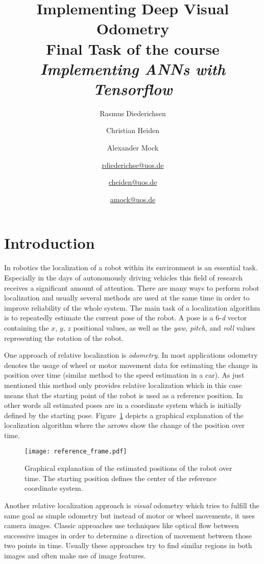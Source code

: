 \documentclass[a4paper,11pt]{article}
\title{Implementing Deep Visual Odometry\\{\large Final Task of the course \emph{Implementing ANNs with Tensorflow}}}
\author{Rasmus Diederichsen \and Christian Heiden \and Alexander Mock\\\and \href{mailto:rdiederichse@uos.de}{rdiederichse@uos.de}\and \href{mailto:cheiden@uos.de}{cheiden@uos.de} \and \href{mailto:amock@uos.de}{amock@uos.de}}
\begin{document}
\maketitle


\section{Introduction}
\label{sec:introduction}
In robotics the localization of a robot within its environment is an essential task. Especially in the days of autonomously driving vehicles this field of research receives a significant amount of attention. There are many ways to perform robot localization and usually several methods are used at the same time in order to improve reliability of the whole system. The main task of a localization algorithm is to repeatedly estimate the current pose of the robot. A pose is a 6-\emph{d} vector containing the $x$, $y$, $z$ positional values, as well as the \emph{yaw}, \emph{pitch}, and \emph{roll} values representing the rotation of the robot.

One approach of relative localization is \emph{odometry}. In most applications odometry denotes the usage of wheel or motor movement data for estimating the change in position over time (similar method to the speed estimation in a car). As just mentioned this method only provides relative localization which in this case means that the starting point of the robot is used as a reference position. In other words all estimated poses are in a coordinate system which is initially defined by the starting pose. Figure~\ref{fig:reference_frame} depicts a graphical explanation of the localization algorithm where the arrows show the change of the position over time.

\begin{figure}[tbh]
    \centering
    \texttt{[image: reference\_frame.pdf]}
    \caption{Graphical explanation of the estimated positions of the robot over time. The starting position defines the center of the reference coordinate system.}
    \label{fig:reference_frame}
\end{figure}

Another relative localization approach is \emph{visual} odometry which tries to fulfill the same goal as simple odometry but instead of motor or wheel movements, it uses camera images. Classic approaches use techniques like optical flow between successive images in order to determine a direction of movement between those two points in time. Usually these approaches try to find similar regions in both images and often make use of image features.
\end{document}

